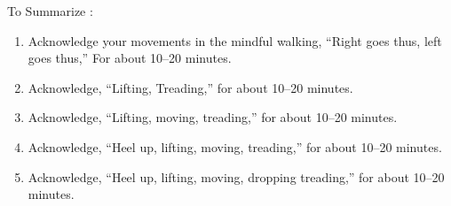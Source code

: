 \documentclass[a5paper,10pt,english]{book}
\begin{document}
\sphinxAtStartPar
To Summarize :
\begin{enumerate}
%
\item {} 
\sphinxAtStartPar
Acknowledge your movements in the mindful walking, “Right goes thus, left goes thus,” For about 10–20 minutes.

\item {} 
\sphinxAtStartPar
Acknowledge, “Lifting, Treading,” for about 10–20 minutes.

\item {} 
\sphinxAtStartPar
Acknowledge, “Lifting, moving, treading,” for about 10–20 minutes.

\item {} 
\sphinxAtStartPar
Acknowledge, “Heel up, lifting, moving, treading,” for about 10–20 minutes.

\item {} 
\sphinxAtStartPar
Acknowledge, “Heel up, lifting, moving, dropping treading,” for about 10–20 minutes.

\end{enumerate}
\end{document}
